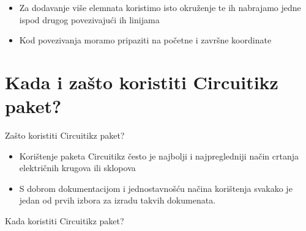 \documentclass{beamer}
\begin{document}
\begin{frame}
    \begin{itemize}
        \item Za dodavanje više elemnata koristimo isto okruženje te ih nabrajamo jedne ispod drugog povezivajući ih linijama
        \item Kod povezivanja moramo pripaziti na početne i završne koordinate
    \end{itemize}
\end{frame}



\section{Kada i zašto koristiti Circuitikz paket?}

\begin{frame}{Zašto koristiti Circuitikz paket?}
  \begin{itemize}
  \item {
    Korištenje paketa Circuitikz često je najbolji i
    najpregledniji način crtanja električnih krugova
    ili sklopova
  }
  \item{
    S dobrom dokumentacijom i jednostavnošću načina korištenja
    svakako je jedan od prvih izbora za izradu takvih 
    dokumenata.
  }
  \end{itemize}
\end{frame}

\begin{frame}{Kada koristiti Circuitikz paket?}
\end{frame}
\end{document}
